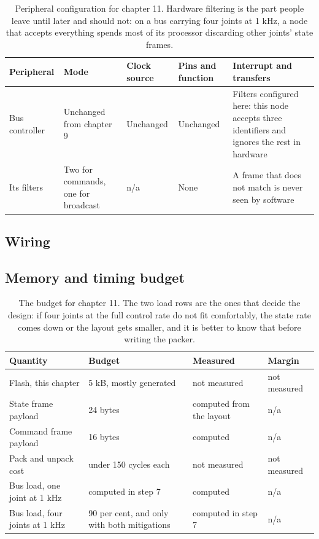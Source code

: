 \begin{table}[H]\centering\small
\begin{tabular}{p{22mm}p{26mm}p{24mm}p{30mm}p{30mm}}
\toprule
Peripheral & Mode & Clock source & Pins and function & Interrupt and transfers \\
\midrule
Bus controller & Unchanged from chapter 9 & Unchanged & Unchanged & Filters configured here: this node accepts three identifiers and ignores the rest in hardware \\
Its filters & Two for commands, one for broadcast & n/a & None & A frame that does not match is never seen by software \\
\bottomrule
\end{tabular}
\caption{Peripheral configuration for chapter 11. Hardware filtering is the part people leave until later and should not: on a bus carrying four joints at 1 kHz, a node that accepts everything spends most of its processor discarding other joints' state frames.}
\end{table}

\subsection*{Wiring}


\subsection*{Memory and timing budget}

\begin{table}[H]\centering\small
\begin{tabular}{p{44mm}p{28mm}p{28mm}p{30mm}}
\toprule
Quantity & Budget & Measured & Margin \\
\midrule
Flash, this chapter & 5 kB, mostly generated & not measured & not measured \\
State frame payload & 24 bytes & computed from the layout & n/a \\
Command frame payload & 16 bytes & computed & n/a \\
Pack and unpack cost & under 150 cycles each & not measured & not measured \\
Bus load, one joint at 1 kHz & computed in step 7 & computed & n/a \\
Bus load, four joints at 1 kHz & 90 per cent, and only with both mitigations & computed in step 7 & n/a \\
\bottomrule
\end{tabular}
\caption{The budget for chapter 11. The two load rows are the ones that decide the design: if four joints at the full control rate do not fit comfortably, the state rate comes down or the layout gets smaller, and it is better to know that before writing the packer.}
\end{table}

